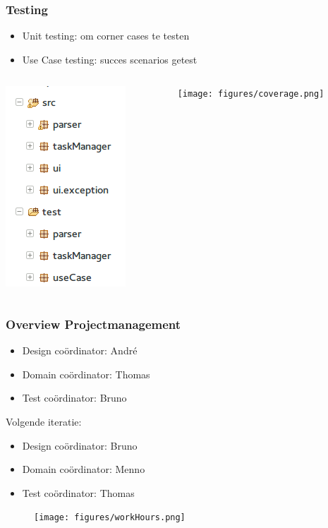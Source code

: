 \documentclass{beamer}
\begin{document}
%

\begin{frame}
\frametitle {Testing}
\begin{itemize}
    \item Unit testing: om corner cases te testen
    \item Use Case testing: succes scenarios getest
\end{itemize}
\begin{columns}
    \begin{column}{.4\paperwidth}
        \includegraphics[width=0.25\paperwidth]{figures/Package_overview_eclipse.png}
    \end{column}
    \begin{column}{.5\paperwidth}
        \texttt{[image: figures/coverage.png]}
    \end{column}
\end{columns}
\end{frame}

\begin{frame}
\frametitle{Overview Projectmanagement}

\begin{itemize}
    \item Design co\"ordinator: Andr\'e
    \item Domain co\"ordinator: Thomas
    \item Test co\"ordinator: Bruno
\end{itemize}

Volgende iteratie:

\begin{itemize}
    \item Design co\"ordinator: Bruno
    \item Domain co\"ordinator: Menno
    \item Test co\"ordinator: Thomas
\end{itemize}

\begin{figure}
    \texttt{[image: figures/workHours.png]}
\end{figure}

\end{frame}
\end{document}
